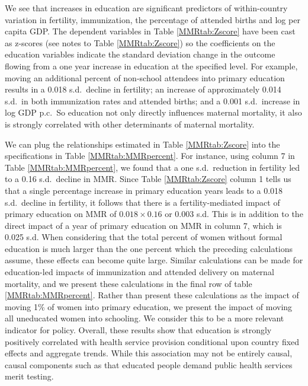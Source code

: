 \documentclass{article}[12pt,subeqn]
\begin{document}
\begin{spacing}{1.4}
We see that increases in education are significant predictors of within-country 
variation in fertility, immunization, the percentage of attended births and log 
per capita GDP. The dependent variables in Table \ref{MMRtab:Zscore} have been 
cast as z-scores (see notes to Table \ref{MMRtab:Zscore}) so the coefficients on 
the education variables indicate the standard deviation change in the outcome 
flowing from a one year increase in education at the specified level. For 
example, moving an additional percent of non-school attendees into primary 
education results in a 0.018 s.d.\ decline in fertility; an increase of 
approximately 0.014 s.d.\ in both immunization rates and attended births; and a 
0.001 s.d.\ increase in log GDP p.c.\ So education not only directly influences 
maternal mortality, it also is strongly correlated with other determinants of 
maternal mortality.

We can plug the relationships estimated in Table \ref{MMRtab:Zscore} into the 
specifications in Table \ref{MMRtab:MMRpercent}. For instance, using column 7 
in Table \ref{MMRtab:MMRpercent}, we found that a one s.d.\ reduction in 
fertility led to a 0.16 s.d.\ decline in MMR. Since Table \ref{MMRtab:Zscore} 
column 1 tells us that a single percentage increase in primary education years 
leads to a 0.018 s.d.\ decline in fertility, it follows that there is a 
fertility-mediated impact of primary education on MMR of $0.018\times 0.16$ or 
0.003 s.d. This is in addition to the direct impact of a year of primary 
education on MMR in column 7, which is 0.025 s.d. When considering that the total 
percent of women without formal education is much larger than the one percent 
which the preceding calculations assume, these effects can become quite large. 
Similar calculations can be made for education-led impacts of immunization and 
attended delivery on maternal mortality, and we present these calculations in the 
final row of table \ref{MMRtab:MMRpercent}. Rather than present these 
calculations as the impact of moving 1\% of women into primary education, we 
present the impact of moving all uneducated women into schooling. We consider 
this to be a more relevant indicator for policy. Overall, these results show that 
education is strongly positively correlated with health service provision 
conditional upon country fixed effects and aggregate trends. While this 
association may not be entirely causal, causal components such as that educated 
people demand public health services merit testing.


\end{spacing}
\end{document}
